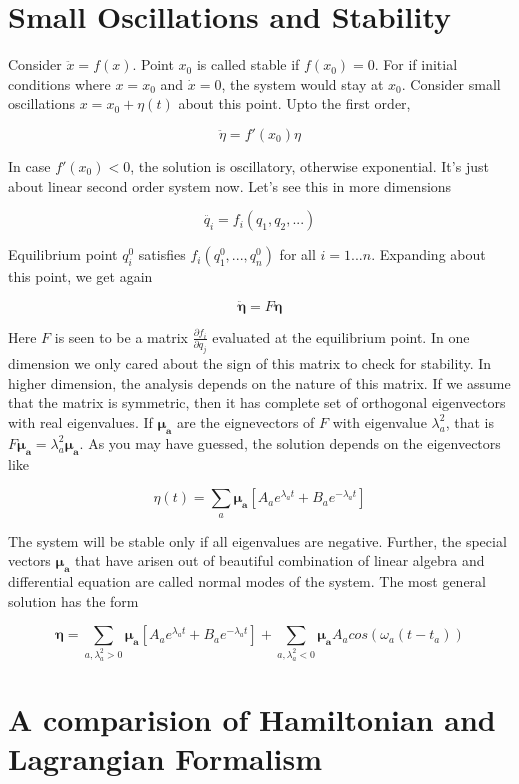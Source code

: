 \documentclass{report}
\begin{document}
\section{Small Oscillations and Stability}

Consider $\ddot{x} = f(x)$. Point $x_0$ is called stable if $f(x_0) = 0$. For if initial conditions where $x=x_0$ and $\dot{x} = 0$, the system would stay at $x_0$. Consider small oscillations $x = x_0 + \eta(t)$ about this point. Upto the first order, 

$$\ddot{\eta} = f'(x_0)\eta$$

\noindent In case $f'(x_0) < 0$, the solution is oscillatory, otherwise exponential. It's just about linear second order system now. Let's see this in more dimensions

$$\ddot{q_i} = f_i(q_1,q_2,...)$$

\noindent Equilibrium point $q_i^{0}$ satisfies $f_i(q_1^0,...,q_n^0)$ for all $i=1...n$. Expanding about this point, we get again

$$\boldsymbol{\ddot{\eta}} = F \boldsymbol{\eta}$$

\noindent Here $F$ is seen to be a matrix $\frac{\partial f_i}{\partial q_j}$ evaluated at the equilibrium point. In one dimension we only cared about the sign of this matrix to check for stability. In higher dimension, the analysis depends on the nature of this matrix. If we assume that the matrix is symmetric, then it has complete set of orthogonal eigenvectors with real eigenvalues. If $\boldsymbol{\mu_a}$ are the eignevectors of $F$ with eigenvalue $\lambda_a^2$, that is $F\boldsymbol{\mu_a}= \lambda_a^2\boldsymbol{\mu_a}$. As you may have guessed, the solution depends on the eigenvectors like

$$\eta(t) = \sum_{a}\boldsymbol{\mu_a}\left[A_ae^{\lambda_a t} + B_ae^{-\lambda_a t}\right]$$

\noindent The system will be stable only if all eigenvalues are negative. Further, the special vectors $\boldsymbol{\mu_a}$ that have arisen out of beautiful combination of linear algebra and differential equation are called normal modes of the system. The most general solution has the form

$$\boldsymbol{\eta} = \sum_{a,\lambda_a^2>0}\boldsymbol{\mu_a}\left[ A_ae^{\lambda_a t} + B_ae^{-\lambda_a t}\right] + \sum_{a,\lambda_a^2<0}\boldsymbol{\mu_a}A_a cos(\omega_a(t-t_a))$$

\section{A comparision of Hamiltonian and Lagrangian Formalism}
\end{document}
